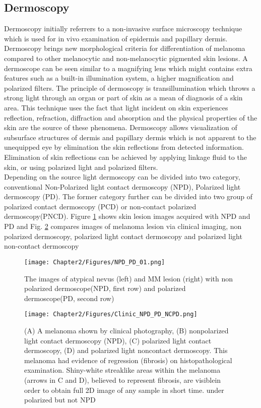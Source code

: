 	\subsection{Dermoscopy}
	Dermoscopy initially referrers to a non-invasive surface microscopy technique which is used for in vivo examination of epidermis and papillary dermis\cite{soyer1987early}. Dermoscopy brings new morphological criteria for differentiation of melanoma compared to other melanocytic and non-melanocytic pigmented skin lesions. A dermoscope can be seen similar to a magnifying lens which might contains extra features such as a built-in illumination system, a higher magnification and polarized filters. The principle of dermoscopy is transillumination which throws a strong light through an organ or part of skin as a mean of diagnosis of a skin area. This technique uses the fact that light incident on skin experiences reflection, refraction, diffraction and absorption and the physical properties of the skin are the source of these phenomena. Dermoscopy allows visualization of subsurface structures of dermis and papillary dermis which is not apparent to the unequipped eye by elimination the skin reflections from detected information. 
 Elimination of skin reflections can be achieved by applying linkage fluid to the skin, or using polarized light and polarized filters. \\
 Depending on the source light dermoscopy can be divided into two category, conventional Non-Polarized light contact dermoscopy (NPD), Polarized light dermoscopy (PD). The former category further can be divided into two group of polarized contact dermoscopy (PCD) or non-contact polarized dermoscopy(PNCD). Figure \ref{fig:NPD-PD} shows skin lesion images acquired with NPD and PD and Fig. \ref{fig:NPD-PD-NCPD} compares images of melanoma lesion via clinical imaging, non polarized dermoscopy, polarized light contact dermoscopy and polarized light non-contact dermoscopy \cite{Benvenuto-Andrade2007}

	\begin{figure}
	\centering
	\texttt{[image: Chapter2/Figures/NPD\_PD\_01.png]}	
	\caption{The images of atypical nevus (left) and MM lesion (right) with non polarized dermoscope(NPD, first row) and polarized dermoscope(PD, second row)\cite{wang2008differences}}
	\label{fig:NPD-PD}
	\end{figure}	 
	
	\begin{figure}
	\centering
	\texttt{[image: Chapter2/Figures/Clinic\_NPD\_PD\_NCPD.png]}	
	\caption{(A) A melanoma shown by clinical photography, (B) nonpolarized light contact dermoscopy (NPD),
(C) polarized light contact dermoscopy, (D) and polarized light noncontact dermoscopy. This melanoma had evidence of regression (fibrosis) on histopathological examination. Shiny-white streaklike areas within the melanoma (arrows in C and D), believed to represent fibrosis, are visiblein order to obtain full 2D image of any sample in short time.  under polarized but not NPD\cite{Benvenuto-Andrade2007}}
	\label{fig:NPD-PD-NCPD}
	\end{figure}	 
	
